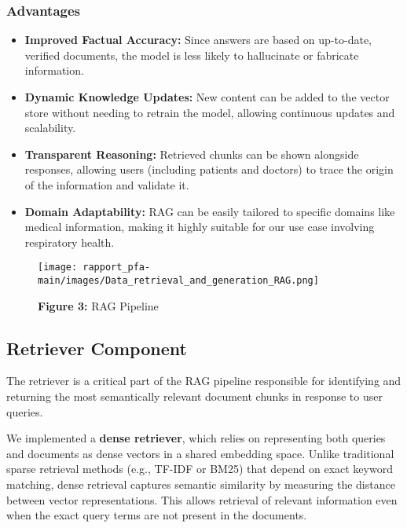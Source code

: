 \subsubsection*{Advantages}
\begin{itemize}
    \item \textbf{Improved Factual Accuracy:} Since answers are based on up-to-date, verified documents, the model is less likely to hallucinate or fabricate information.
    
    \item \textbf{Dynamic Knowledge Updates:} New content can be added to the vector store without needing to retrain the model, allowing continuous updates and scalability.
    
    \item \textbf{Transparent Reasoning:} Retrieved chunks can be shown alongside responses, allowing users (including patients and doctors) to trace the origin of the information and validate it.
    
    \item \textbf{Domain Adaptability:} RAG can be easily tailored to specific domains like medical information, making it highly suitable for our use case involving respiratory health.
\end{itemize}

\begin{figure}[htbp]
  \centering
  \texttt{[image: rapport\_pfa-main/images/Data\_retrieval\_and\_generation\_RAG.png]}
  \caption*{\textbf{Figure 3:} RAG Pipeline} %
  \label{fig:indexing-process-manual}
\end{figure}

\subsection{Retriever Component}
\label{subsec:retriever}

The retriever is a critical part of the RAG pipeline responsible for identifying and returning the most semantically relevant document chunks in response to user queries.

We implemented a \textbf{dense retriever}, which relies on representing both queries and documents as dense vectors in a shared embedding space. Unlike traditional sparse retrieval methods (e.g., TF-IDF or BM25) that depend on exact keyword matching, dense retrieval captures semantic similarity by measuring the distance between vector representations. This allows retrieval of relevant information even when the exact query terms are not present in the documents.

